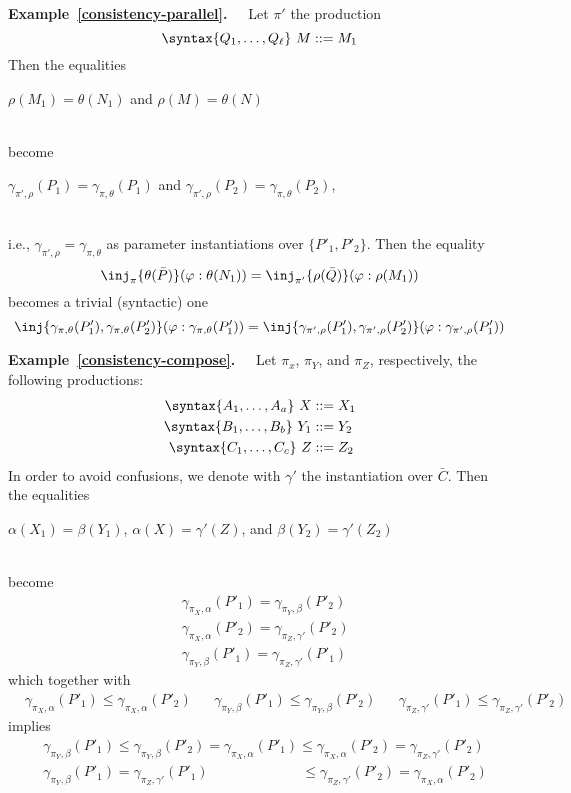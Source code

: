 \documentclass{article}
\theoremstyle{definition}
\theoremstyle{definition}
\theoremstyle{definition}
\theoremstyle{definition}
\theoremstyle{definition}
\theoremstyle{theorem}
\theoremstyle{theorem}
\theoremstyle{theorem}
\theoremstyle{theorem}
\theoremstyle{theorem}
\begin{document}
\begin{enumerate}[label=(\arabic*)]
{ \noindent
 \textbf{Example~\ref{consistency-parallel}.~~} 
Let $\pi'$ the production
\[\syntax\{Q_1,\ldots,Q_\ell\}\ M::=M_1\]
Then the equalities \\[1ex]
\centerline{\(\rho(M_1) = \theta(N_1)\) and \(\rho(M) = \theta(N)\)}\\[1ex]
become\\[1ex]
\centerline{$\gamma_{\pi',\rho}(P_1)=\gamma_{\pi,\theta}(P_1)$ and 
$\gamma_{\pi',\rho}(P_2)=\gamma_{\pi,\theta}(P_2)$,}\\[1ex]
i.e., $\gamma_{\pi',\rho}=\gamma_{\pi,\theta}$ as parameter instantiations over $\{P'_1,P'_2\}$.
Then the equality
\[\inj_{\pi}\{\theta(\bar{P})\}(\varphi:\theta(N_1))
 = \inj_{\pi'}\{\rho(\bar{Q})\}(\varphi:\rho(M_1))\]
 becomes a trivial (syntactic) one
 \[\inj\{\gamma_{\pi,\theta}(P'_1),\gamma_{\pi,\theta}(P'_2)\}(\varphi:\gamma_{\pi,\theta}(P'_1))
 =
 \inj\{\gamma_{\pi',\rho}(P'_1),\gamma_{\pi',\rho}(P'_2)\}(\varphi:\gamma_{\pi',\rho}(P'_1))\]
 
 \noindent
 \textbf{Example~\ref{consistency-compose}.~~}
Let $\pi_x$, $\pi_Y$, and $\pi_Z$, respectively, the following productions:
 \begin{align*}
\syntax\{A_1,\ldots,A_a\}\ X & ::=X_1\\
\syntax\{B_1,\ldots,B_b\}\ Y_1 & ::=Y_2\\
\syntax\{C_1,\ldots,C_c\}\ Z & ::=Z_2\\
\end{align*}
In order to avoid confusions, we denote with $\gamma'$ the instantiation over $\bar{C}$.
Then the equalities
\\[1ex]
\centerline{\(\alpha(X_1) = \beta(Y_1)\), \(\alpha(X) = \gamma'(Z)\),
and \(\beta(Y_2) = \gamma'(Z_2)\)}
\\[1ex]
become
\begin{align*}
& \gamma_{\pi_X,\alpha}(P'_1)=\gamma_{\pi_Y,\beta}(P'_2)\\
& \gamma_{\pi_X,\alpha}(P'_2)=\gamma_{\pi_Z,\gamma'}(P'_2)\\
& \gamma_{\pi_Y,\beta}(P'_1)=\gamma_{\pi_Z,\gamma'}(P'_1)
\end{align*}
which together with
\begin{align*}
&\gamma_{\pi_X,\alpha}(P'_1)\le\gamma_{\pi_X,\alpha}(P'_2)
&&\gamma_{\pi_Y,\beta}(P'_1)\le\gamma_{\pi_Y,\beta}(P'_2)
&&\gamma_{\pi_Z,\gamma'}(P'_1)\le\gamma_{\pi_Z,\gamma'}(P'_2)
\end{align*}
implies 
\begin{align*}
&\gamma_{\pi_Y,\beta}(P'_1)\le\gamma_{\pi_Y,\beta}(P'_2)=\gamma_{\pi_X,\alpha}(P'_1)\le \gamma_{\pi_X,\alpha}(P'_2)=\gamma_{\pi_Z,\gamma'}(P'_2)\\
&\gamma_{\pi_Y,\beta}(P'_1)=\gamma_{\pi_Z,\gamma'}(P'_1)
\phantom{{}=\gamma_{\pi_X,\alpha}(P'_1)}
\le \gamma_{\pi_Z,\gamma'}(P'_2) = \gamma_{\pi_X,\alpha}(P'_2)
\end{align*}

}
\end{enumerate}
\end{document}
